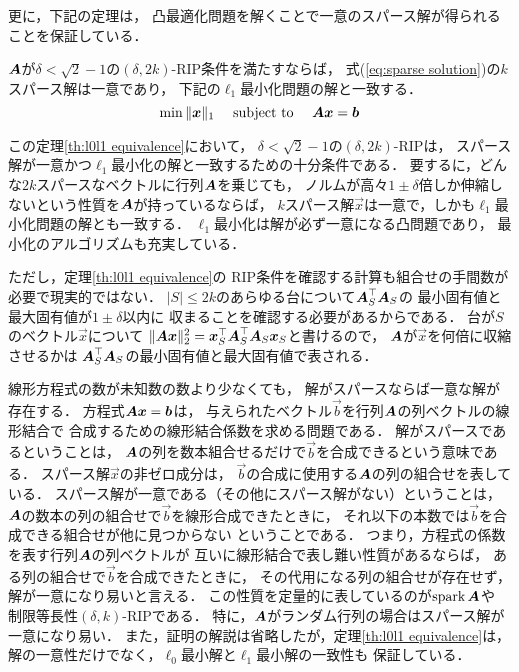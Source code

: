 更に，下記の定理は，
凸最適化問題を解くことで一意のスパース解が得られることを保証している．
\begin{theorem}
\label{th:l0l1 equivalence}
$\mbox{\boldmath $A$}$が$\delta<\sqrt{2}-1$の$(\delta,2k)$-RIP条件を満たすならば，
式(\ref{eq:sparse solution})の$k$スパース解は一意であり，
下記の$\ell_1$最小化問題の解と一致する．
\begin{equation}
 \min\|\mbox{\boldmath $x$}\|_1\quad\mbox{ subject to }\quad \mbox{\boldmath $A$}\mbox{\boldmath $x$}=\mbox{\boldmath $b$}
\label{eq:l1 minimization}
\end{equation}
\end{theorem}
この定理\ref{th:l0l1 equivalence}において，
$\delta<\sqrt{2}-1$の$(\delta,2k)$-RIPは，
スパース解が一意かつ$\ell_1$最小化の解と一致するための十分条件である．
要するに，どんな$2k$スパースなベクトルに行列$\mbox{\boldmath $A$}$を乗じても，
ノルムが高々$1\pm\delta$倍しか伸縮しないという性質を$\mbox{\boldmath $A$}$が持っているならば，
$k$スパース解$\vec x$は一意で，しかも$\ell_1$最小化問題の解とも一致する．
$\ell_1$最小化は解が必ず一意になる凸問題であり，
最小化のアルゴリズムも充実している．

ただし，定理\ref{th:l0l1 equivalence}の
RIP条件を確認する計算も組合せの手間数が必要で現実的ではない．
$|S|\leq 2k$のあらゆる台について$\mbox{\boldmath $A$}_S^\top\mbox{\boldmath $A$}_S$の
最小固有値と最大固有値が$1\pm\delta$以内に
収まることを確認する必要があるからである．
台が$S$のベクトル$\vec x$について
$\|\mbox{\boldmath $A$}\mbox{\boldmath $x$}\|_2^2=\mbox{\boldmath $x$}_S^\top\mbox{\boldmath $A$}_S^\top\mbox{\boldmath $A$}_S\mbox{\boldmath $x$}_S$と書けるので，
$\mbox{\boldmath $A$}$が$\vec x$を何倍に収縮させるかは
$\mbox{\boldmath $A$}_S^\top\mbox{\boldmath $A$}_S$の最小固有値と最大固有値で表される．




線形方程式の数が未知数の数より少なくても，
解がスパースならば一意な解が存在する．
方程式$\mbox{\boldmath $A$}\mbox{\boldmath $x$}=\mbox{\boldmath $b$}$は，
与えられたベクトル$\vec b$を行列$\mbox{\boldmath $A$}$の列ベクトルの線形結合で
合成するための線形結合係数を求める問題である．
解がスパースであるということは，
$\mbox{\boldmath $A$}$の列を数本組合せるだけで$\vec b$を合成できるという意味である．
スパース解$\vec x$の非ゼロ成分は，
$\vec b$の合成に使用する$\mbox{\boldmath $A$}$の列の組合せを表している．
スパース解が一意である（その他にスパース解がない）ということは，
$\mbox{\boldmath $A$}$の数本の列の組合せで$\vec b$を線形合成できたときに，
それ以下の本数では$\vec b$を合成できる組合せが他に見つからない
ということである．
つまり，方程式の係数を表す行列$\mbox{\boldmath $A$}$の列ベクトルが
互いに線形結合で表し難い性質があるならば，
ある列の組合せで$\vec b$を合成できたときに，
その代用になる列の組合せが存在せず，解が一意になり易いと言える．
この性質を定量的に表しているのが$\mathop{\textrm{spark}}\nolimits\mbox{\boldmath $A$}$や
制限等長性$(\delta,k)$-RIPである．
特に，$\mbox{\boldmath $A$}$がランダム行列の場合はスパース解が一意になり易い．
%
また，証明の解説は省略したが，定理\ref{th:l0l1 equivalence}は，
解の一意性だけでなく，$\ell_0$最小解と$\ell_1$最小解の一致性も
保証している．

